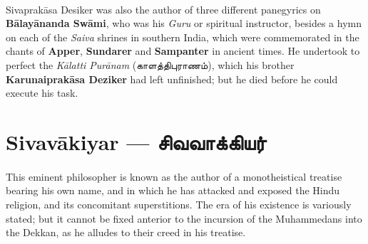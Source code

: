 \documentclass{article}
\newcommand{\TamilText}[1]{\texttamil{#1}}
\newcommand{\TamilBold}[1]{\texttamil{\textbf{#1}}}
\newcommand{\tam}[1]{\TamilText{#1}}
\newcommand{\tambold}[1]{\TamilBold{#1}}
\begin{document}
\paragraph{}
Sivaprak\={a}sa Desiker was also the author of three different panegyrics on \textbf{B\={a}lay\={a}nanda Sw\={a}mi}, who was his \emph{Guru} or spiritual instructor, besides a hymn on each of the \emph{Saiva} shrines in southern India, which were commemorated in the chants of \textbf{Apper}, \textbf{Sundarer} and \textbf{Sampanter} in ancient times. He undertook to perfect the \emph{K\={a}latti Pur\={a}nam} (\tam{காளத்திபுராணம்}), which his brother \textbf{Karunaiprak\={a}sa Deziker} had left unfinished; but he died before he could execute his task.

\section{Sivav\={a}kiyar --- \tambold{சிவவாக்கியர்}}
\paragraph{}
This eminent philosopher is known as the author of a monotheistical treatise bearing his own name, and in which he has attacked and exposed the Hindu religion, and its concomitant superstitions. The era of his existence is variously stated; but it cannot be fixed anterior to the incursion of the Muhammedans into the Dekkan, as he alludes to their creed in his treatise.
\end{document}
